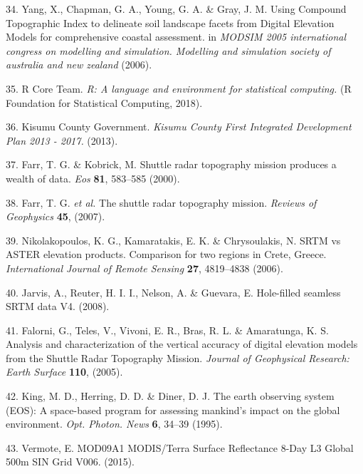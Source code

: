\documentclass[12pt,oneside]{article}
\begin{document}
\leavevmode\hypertarget{ref-Yang_et_al_2006}{}%
34. Yang, X., Chapman, G. A., Young, G. A. \& Gray, J. M. Using Compound Topographic Index to delineate soil landscape facets from Digital Elevation Models for comprehensive coastal assessment. in \emph{MODSIM 2005 international congress on modelling and simulation. Modelling and simulation society of australia and new zealand} (2006).

\leavevmode\hypertarget{ref-RCoreTeam_2018}{}%
35. R Core Team. \emph{R: A language and environment for statistical computing.} (R Foundation for Statistical Computing, 2018).

\leavevmode\hypertarget{ref-KisumuCountyGovernment_2013}{}%
36. Kisumu County Government. \emph{Kisumu County First Integrated Development Plan 2013 - 2017.} (2013).

\leavevmode\hypertarget{ref-Farr_et_al_2000}{}%
37. Farr, T. G. \& Kobrick, M. Shuttle radar topography mission produces a wealth of data. \emph{Eos} \textbf{81}, 583--585 (2000).

\leavevmode\hypertarget{ref-Farr_et_al_2007}{}%
38. Farr, T. G. \emph{et al.} The shuttle radar topography mission. \emph{Reviews of Geophysics} \textbf{45}, (2007).

\leavevmode\hypertarget{ref-Nikolakopoulos_et_al_2006}{}%
39. Nikolakopoulos, K. G., Kamaratakis, E. K. \& Chrysoulakis, N. SRTM vs ASTER elevation products. Comparison for two regions in Crete, Greece. \emph{International Journal of Remote Sensing} \textbf{27}, 4819--4838 (2006).

\leavevmode\hypertarget{ref-Jarvis_et_al_2008}{}%
40. Jarvis, A., Reuter, H. I. I., Nelson, A. \& Guevara, E. Hole-filled seamless SRTM data V4. (2008).

\leavevmode\hypertarget{ref-Falorni_et_al_2005}{}%
41. Falorni, G., Teles, V., Vivoni, E. R., Bras, R. L. \& Amaratunga, K. S. Analysis and characterization of the vertical accuracy of digital elevation models from the Shuttle Radar Topography Mission. \emph{Journal of Geophysical Research: Earth Surface} \textbf{110}, (2005).

\leavevmode\hypertarget{ref-King_et_al_1995}{}%
42. King, M. D., Herring, D. D. \& Diner, D. J. The earth observing system (EOS): A space-based program for assessing mankind's impact on the global environment. \emph{Opt. Photon. News} \textbf{6}, 34--39 (1995).

\leavevmode\hypertarget{ref-Vermote_2015}{}%
43. Vermote, E. MOD09A1 MODIS/Terra Surface Reflectance 8-Day L3 Global 500m SIN Grid V006. (2015).
\end{document}
